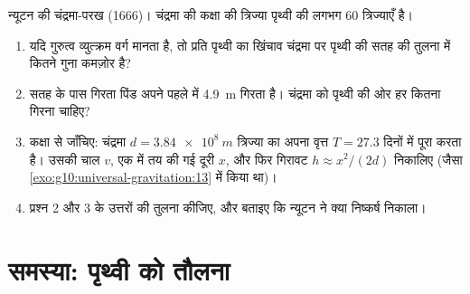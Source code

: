 \begin{exercise}[$\star\star\star$]\label{exo:g10:universal-gravitation:15}
न्यूटन की चंद्रमा-परख (1666)। चंद्रमा की कक्षा की त्रिज्या
पृथ्वी की लगभग $60$ त्रिज्याएँ है।
\begin{enumerate}
  \item यदि गुरुत्व व्युत्क्रम वर्ग मानता है, तो प्रति
         पृथ्वी का खिंचाव चंद्रमा पर पृथ्वी की सतह की
        तुलना में कितने गुना कमज़ोर है?
  \item सतह के पास गिरता पिंड अपने पहले  में \qty{4.9}{m} गिरता है।
        चंद्रमा को पृथ्वी की ओर हर  कितना गिरना चाहिए?
  \item कक्षा से जाँचिए: चंद्रमा $d = \qty{3.84e8}{m}$ त्रिज्या का अपना
        वृत्त $T = 27.3$ दिनों में पूरा करता है। उसकी चाल $v$, एक
         में तय की गई दूरी $x$, और फिर गिरावट $h \approx x^2/(2d)$
        निकालिए (जैसा \cref{exo:g10:universal-gravitation:13} में किया था)।
  \item प्रश्न 2 और 3 के उत्तरों की तुलना कीजिए, और बताइए कि न्यूटन ने
        क्या निष्कर्ष निकाला।
\end{enumerate}
\end{exercise}

\section{समस्या: पृथ्वी को तौलना}

